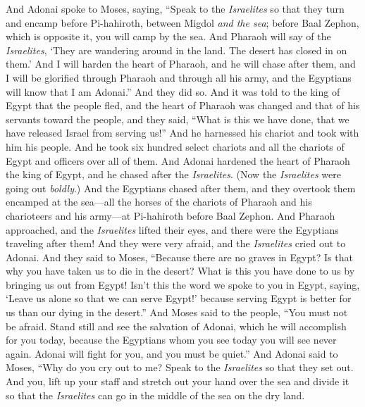 \begin{biblechapter} %
 And Adonai spoke to Moses, saying,
\verse “Speak to the \textit{Israelites} so that they turn and encamp before Pi-hahiroth, between Migdol \textit{and the sea}; before Baal Zephon, which is opposite it, you will camp by the sea.
\verse And Pharaoh will say of the \textit{Israelites}, ‘They are wandering around in the land. The desert has closed in on them.’
\verse And I will harden the heart of Pharaoh, and he will chase after them, and I will be glorified through Pharaoh and through all his army, and the Egyptians will know that I am Adonai.” And they did so.
\verse And it was told to the king of Egypt that the people fled, and the heart of Pharaoh was changed and that of his servants toward the people, and they said, “What is this we have done, that we have released Israel from serving us!”
\verse And he harnessed his chariot and took with him his people.
\verse And he took six hundred select chariots and all the chariots of Egypt and officers over all of them.
\verse And Adonai hardened the heart of Pharaoh the king of Egypt, and he chased after the \textit{Israelites}. (Now the \textit{Israelites} were going out \textit{boldly}.)
\verse And the Egyptians chased after them, and they overtook them encamped at the sea—all the horses of the chariots of Pharaoh and his charioteers and his army—at Pi-hahiroth before Baal Zephon.
\verse And Pharaoh approached, and the \textit{Israelites} lifted their eyes, and there were the Egyptians traveling after them! And they were very afraid, and the \textit{Israelites} cried out to Adonai.
\verse And they said to Moses, “Because there are no graves in Egypt? Is that why you have taken us to die in the desert? What is this you have done to us by bringing us out from Egypt!
\verse Isn’t this the word we spoke to you in Egypt, saying, ‘Leave us alone so that we can serve Egypt!’ because serving Egypt is better for us than our dying in the desert.”
\verse And Moses said to the people, “You must not be afraid. Stand still and see the salvation of Adonai, which he will accomplish for you today, because the Egyptians whom you see today you will see never again.
\verse Adonai will fight for you, and you must be quiet.”
\verse And Adonai said to Moses, “Why do you cry out to me? Speak to the \textit{Israelites} so that they set out.
\verse And you, lift up your staff and stretch out your hand over the sea and divide it so that the \textit{Israelites} can go in the middle of the sea on the dry land.

\end{biblechapter}
